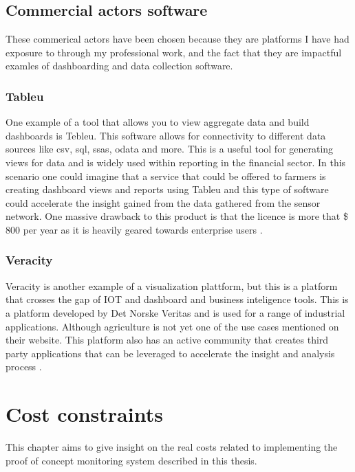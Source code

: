 \documentclass[]{uiophd}
\begin{document}
\section{Commercial actors software}
These commerical actors have been chosen because they are platforms I have had exposure to through my professional work, and the fact that they are impactful examles of dashboarding and data collection software.
\subsection{Tableu}
One example of a tool that allows you to view aggregate data and build dashboards is Tebleu. This software allows for connectivity to different data sources like csv, sql, ssas, odata and more. This is a useful tool for generating views for data and is widely used within reporting in the financial sector. In this scenario one could imagine that a service that could be offered to farmers is creating dashboard views and reports using Tableu and  this type of software could accelerate the insight gained from the data gathered from the sensor network. One massive drawback to this product is that the licence is more that \$ 800 per year as it is heavily geared towards enterprise users \cite{tableu}.

\subsection{Veracity}
Veracity is another example of a visualization plattform, but this is a platform that crosses the gap of IOT and dashboard and business inteligence tools. This is a platform developed by Det Norske Veritas and is used for a range of industrial applications. Although agriculture is not yet one of the use cases mentioned on their website. This platform also has an active community that creates third party applications that can be leveraged to accelerate the insight and analysis process \cite{veracity}.

\chapter{Cost constraints}

This chapter aims to give insight on the real costs related to implementing the proof of concept monitoring system described in this thesis.
\end{document}
